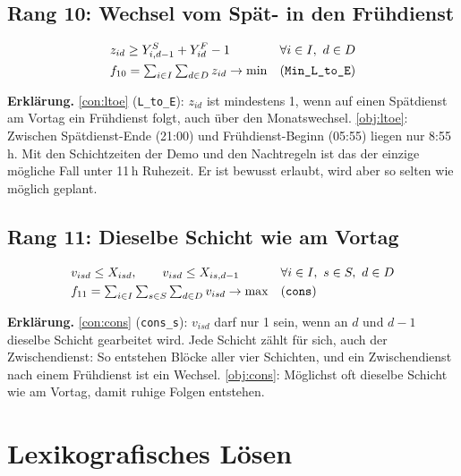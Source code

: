 \documentclass[11pt]{combiArticle}
\newcommand{\code}[1]{\texttt{#1}}
\begin{document}
\subsection{Rang 10: Wechsel vom Spät- in den Frühdienst}\label{sec:z:spaetfrueh}

\begin{align}
  & z_{id} \ge Y^{S}_{i,d-1} + Y^{F}_{id} - 1 && \forall i \in I,\ d \in D \label{con:ltoe}\\
  & f_{10} = \textstyle\sum_{i \in I} \sum_{d \in D} z_{id} \to \min && \text{(\code{Min\_L\_to\_E})} \label{obj:ltoe}
\end{align}

\textbf{Erklärung.}
\eqref{con:ltoe} (\code{L\_to\_E}): $z_{id}$ ist mindestens 1, wenn auf einen Spätdienst am Vortag ein Frühdienst
folgt, auch über den Monatswechsel.
\eqref{obj:ltoe}: Zwischen Spätdienst-Ende (21:00) und Frühdienst-Beginn (05:55) liegen nur 8:55\,h. Mit den
Schichtzeiten der Demo und den Nachtregeln ist das der einzige mögliche Fall unter 11\,h Ruhezeit. Er ist bewusst
erlaubt, wird aber so selten wie möglich geplant.

\subsection{Rang 11: Dieselbe Schicht wie am Vortag}\label{sec:z:folgen}

\begin{align}
  & v_{isd} \le X_{isd},\qquad v_{isd} \le X_{is,d-1} && \forall i \in I,\ s \in S,\ d \in D \label{con:cons}\\
  & f_{11} = \textstyle\sum_{i \in I} \sum_{s \in S} \sum_{d \in D} v_{isd} \to \max && \text{(\code{cons})} \label{obj:cons}
\end{align}

\textbf{Erklärung.}
\eqref{con:cons} (\code{cons\_s}): $v_{isd}$ darf nur 1 sein, wenn an $d$ und $d-1$ dieselbe Schicht gearbeitet
wird. Jede Schicht zählt für sich, auch der Zwischendienst: So entstehen Blöcke aller vier Schichten, und ein
Zwischendienst nach einem Frühdienst ist ein Wechsel.
\eqref{obj:cons}: Möglichst oft dieselbe Schicht wie am Vortag, damit ruhige Folgen entstehen.

\section{Lexikografisches Lösen}\label{sec:lex}
\end{document}
